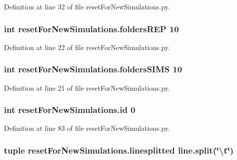 Definition at line 32 of file reset\-For\-New\-Simulations.\-py.

\hypertarget{namespacereset_for_new_simulations_a3869e711bac998c005313abd611c6158}{
\subsubsection[{folders\-R\-E\-P}]{\setlength{\rightskip}{0pt plus 5cm}int reset\-For\-New\-Simulations.\-folders\-R\-E\-P 10}}\label{namespacereset_for_new_simulations_a3869e711bac998c005313abd611c6158}


Definition at line 22 of file reset\-For\-New\-Simulations.\-py.

\hypertarget{namespacereset_for_new_simulations_a60b4005683b2bced2f3e0b22a66abd47}{
\subsubsection[{folders\-S\-I\-M\-S}]{\setlength{\rightskip}{0pt plus 5cm}int reset\-For\-New\-Simulations.\-folders\-S\-I\-M\-S 10}}\label{namespacereset_for_new_simulations_a60b4005683b2bced2f3e0b22a66abd47}


Definition at line 21 of file reset\-For\-New\-Simulations.\-py.

\hypertarget{namespacereset_for_new_simulations_a9defa7f80f548a96cc89f83a6140727d}{
\subsubsection[{id}]{\setlength{\rightskip}{0pt plus 5cm}int reset\-For\-New\-Simulations.\-id 0}}\label{namespacereset_for_new_simulations_a9defa7f80f548a96cc89f83a6140727d}


Definition at line 83 of file reset\-For\-New\-Simulations.\-py.

\hypertarget{namespacereset_for_new_simulations_a8479d45d2399e5ddd429e2dc4961204a}{
\subsubsection[{linesplitted}]{\setlength{\rightskip}{0pt plus 5cm}tuple reset\-For\-New\-Simulations.\-linesplitted line.\-split(\char`\"{}\textbackslash{}t\char`\"{})}}\label{namespacereset_for_new_simulations_a8479d45d2399e5ddd429e2dc4961204a}


